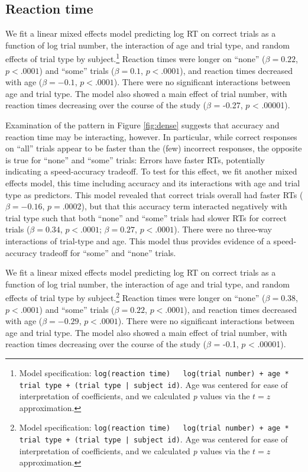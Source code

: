 \documentclass[10pt, letterpaper]{article}
\begin{document}
\subsection{Reaction time}\label{reaction-time}

We fit a linear mixed effects model predicting log RT on correct trials
as a function of log trial number, the interaction of age and trial
type, and random effects of trial type by subject.\footnote{Model
  specification:
  \texttt{log(reaction time) ~ log(trial number) + age * trial type + (trial type | subject id)}.
  Age was centered for ease of interpretation of coefficients, and we
  calculated \emph{p} values via the \(t=z\) approximation.} Reaction
times were longer on ``none'' (\(\beta = 0.22\), \(p < .0001\)) and
``some'' trials (\(\beta = 0.1\), \(p < .0001\)), and reaction times
decreased with age (\(\beta = -0.1\), \(p < .0001\)). There were no
significant interactions between age and trial type. The model also
showed a main effect of trial number, with reaction times decreasing
over the course of the study (\(\beta\) = -0.27, \(p\) \textless{}
.00001).

Examination of the pattern in Figure \ref{fig:dense} suggests that
accuracy and reaction time may be interacting, however. In particular,
while correct responses on ``all'' trials appear to be faster than the
(few) incorrect responses, the opposite is true for ``none'' and
``some'' trials: Errors have faster RTs, potentially indicating a
speed-accuracy tradeoff. To test for this effect, we fit another mixed
effects model, this time including accuracy and its interactions with
age and trial type as predictors. This model revealed that correct
trials overall had faster RTs (\(\beta = -0.16\), \(p = .0002\)), but
that this accuracy term interacted negatively with trial type such that
both ``none'' and ``some'' trials had slower RTs for correct trials
(\(\beta = 0.34\), \(p < .0001\); \(\beta = 0.27\), \(p < .0001\)).
There were no three-way interactions of trial-type and age. This model
thus provides evidence of a speed-accuracy tradeoff for ``some'' and
``none'' trials.

We fit a linear mixed effects model predicting log RT on correct trials
as a function of log trial number, the interaction of age and trial
type, and random effects of trial type by subject.\footnote{Model
  specification:
  \texttt{log(reaction time) ~ log(trial number) + age * trial type + (trial type | subject id)}.
  Age was centered for ease of interpretation of coefficients, and we
  calculated \emph{p} values via the \(t=z\) approximation.} Reaction
times were longer on ``none'' (\(\beta = 0.38\), \(p < .0001\)) and
``some'' trials (\(\beta = 0.22\), \(p < .0001\)), and reaction times
decreased with age (\(\beta = -0.29\), \(p < .0001\)). There were no
significant interactions between age and trial type. The model also
showed a main effect of trial number, with reaction times decreasing
over the course of the study (\(\beta\) = -0.1, \(p\) \textless{}
.00001).
\end{document}
